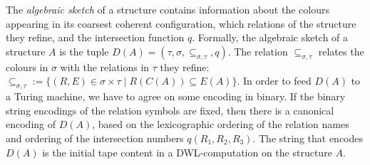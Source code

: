 \documentclass[10pt,a4paper]{article}
\begin{document}
	The \emph{algebraic sketch} of a structure contains information about the colours appearing in its coarsest coherent configuration, which relations of the structure they refine, and the intersection function $q$. Formally, the algebraic sketch of a structure $A$
	is the tuple $D(A) = (\tau,\sigma, \subseteq_{\sigma,\tau},q)$. The relation $\subseteq_{\sigma,\tau}$ relates the colours in $\sigma$ with the relations in $\tau$ they refine: $\subseteq_{\sigma,\tau} := \{ (R,E) \in \sigma \times \tau \mid R(C(A)) \subseteq E(A)  \}$. 
	In order to feed $D(A)$ to a Turing machine, we have to agree on some encoding in binary. If the binary string encodings of the relation symbols are fixed, then there is a canonical encoding of $D(A)$, based on the lexicographic ordering of the relation names and ordering of the intersection numbers  $q(R_1,R_2,R_3)$. The string that encodes $D(A)$ is the initial tape content in a DWL-computation on the structure $A$.
	
\end{document}
